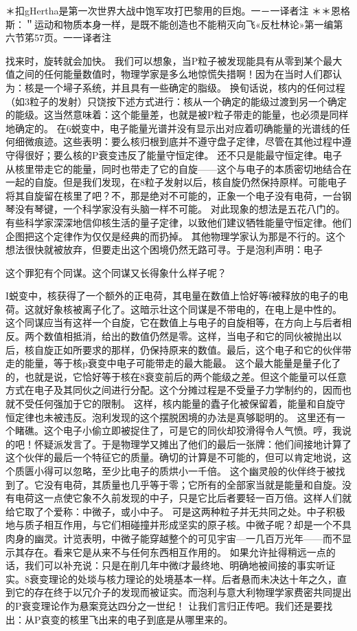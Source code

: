 {＊扣gHertha是第一次世界大战中饱军攻打巴黎用的巨炮。一－一译者注
＊＊恩格斯：＂运动和物质本身一样，是既不能创造也不能稍灭向飞«反杜林论»第一编第六节笫57页。一一译者注

找来时，旋转就会加快。
我们可以想象，当P粒子被发现能具有从零到某个最大值之间的任何能量数值时，物理学家是多么地惊慌失措啊！因为在当时人们郡认为：核是一个埽子系统，并且具有一些确定的脂级。
换旬话说，核内的任何过程（如3粒子的发射）只饶按下述方式进行：核从一个确定的能级过渡到另一个确定的能级。这当然意味着：这个能量差，也就是被P粒子带走的能量，也必须是同样地确定的。
在6蜕变中，电子能量光谱并没有显示出对应着叨确能量的光谱线的任何细微痕迹。这些表明：要么核归根到底并不遵守盘子定律，尽管在其他过程中遵守得很好；要么核的P衰变违反了能量守恒定律。
还不只是能最守恒定律。电子从核里带走它的能量，同时也带走了它的自旋——这个与电子的本质密切地结合在一起的自旋。但是我们发现，在8粒子发射以后，核自旋仍然保持原样。可能电子将其自旋留在核里了吧？不，那是绝对不可能的，正象一个电子没有电荷，一台钢琴没有琴键，一个科学家没有头脑一样不可能。
对此现象的想法是五花八门的。有些科学家深深地信仰核生活的量子定律，以致他们建议牺牲能量守恒定律。他们企图把这个定律作为仅仅是经典的而扔掉。
其他物理学家认为那是不行的。这个想法很快就被放弃，但要走出这个困境仍然无路可寻。于是泡利声明：电子

这个罪犯有个同谋。这个同谋又长得象什么样子呢？
{I蜕变中，核获得了一个额外的正电荷，其电量在数值上恰好等f被释放的电子的电荷。这就好象核被离子化了。这暗示壮这个同谋是不带电的，在电上是中性的。
这个同谋应当有这祥一个自旋，它在数值上与电子的自旋相等，在方向上与后者相反。两个数值相抵消，给出的数值仍然是零。这样，当电子和它的同伙被抛出以后，核自旋正如所要求的那样，仍保持原来的数值。最后，这个电子和它的伙伴带走的能量，等于核p衰变中电子可能带走的最大能最。
这个最大能量是量子化了的，也就是说，它恰好等于核在8衰变前后的两个能级之差。但这个能量可以任意方式在电子及其同伙之间进行分配。这个分摊过程是不受量子力学制约的，因而也就不受任何强加于它的限制。
这样，核内能量的蠹子化被保留着，能量和自旋守恒定律也未被违反。泡利发现的这个摆脱困境的办法是真够聪明的。
这里还有一个睹礁。这个电子小偷立即被捉住了，可是它的同伙却狡滑得令人气愤。哼，我说的吧！怀疑派发言了。于是物理学又摊出了他们的最后一张牌：他们间接地计算了这个伙伴的最后一个特征它的质量。确切的计算是不可能的，但可以肯定地说，这个质匮小得可以忽略，至少比电子的质烘小一千倍。
这个幽灵般的伙伴终于被找到了。它没有电荷，其质量也几乎等于零；它所有的全部家当就是能量和自旋。没有电荷这一点使它象不久前发现的中子，只是它比后者要轻一百万倍。这样人们就给它取了个爱称：中微子，或小中子。
可是这两种粒子并无共同之处。中子积极地与质子相互作用，与它们相碰撞并形成坚实的原子核。中微子呢？却是一个不具肉身的幽灵。计览表明，中微子能穿越整个的可见宇宙—一几百万光年——而不显示其存在。看来它是从来不与任何东西相互作用的。
如果允许扯得稍远一点的话，我们可以补充说：只是在削几年中微f才最终地、明确地被间接的事实听证实。8衰变理论的处埮与核力理论的处境基本一样。后者悬而未决达十年之久，直到它的存在终于以冗介子的发现而被证实。而泡利与意大利物理学家费密共同提出的P衰变理论作为悬案竞达四分之一世纪！
让我们言归正传吧。我们还是要找出：从P哀变的核里飞出来的电子到底是从哪里来的。

}}
